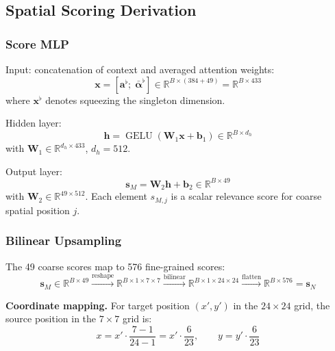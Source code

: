 \documentclass[11pt,a4paper]{article}
\DeclareMathOperator{\GELU}{GELU}
\newcommand{\R}{\mathbb{R}}
\newcommand{\vs}{\mathbf{s}}
\begin{document}
\subsection{Spatial Scoring Derivation}
\label{subsec:score_deriv}

\subsubsection{Score MLP}

Input: concatenation of context and averaged attention weights:
\begin{equation}
  \mathbf{x} = [\mathbf{a}^{\flat};\;
    \bar{\boldsymbol{\alpha}}^{\flat}]
    \in \R^{B \times (384 + 49)}
    = \R^{B \times 433}
\end{equation}
where $\mathbf{x}^{\flat}$ denotes squeezing the singleton dimension.

Hidden layer:
\begin{equation}
  \mathbf{h} = \GELU(\mathbf{W}_1 \mathbf{x} + \mathbf{b}_1)
    \in \R^{B \times d_h}
  \label{eq:score_hidden}
\end{equation}
with $\mathbf{W}_1 \in \R^{d_h \times 433}$, $d_h = 512$.

Output layer:
\begin{equation}
  \vs_M = \mathbf{W}_2 \mathbf{h} + \mathbf{b}_2
    \in \R^{B \times 49}
  \label{eq:score_output}
\end{equation}
with $\mathbf{W}_2 \in \R^{49 \times 512}$. Each element $s_{M,j}$ is a
scalar relevance score for coarse spatial position $j$.

\subsubsection{Bilinear Upsampling}

The 49 coarse scores map to 576 fine-grained scores:
\begin{equation}
  \vs_M \in \R^{B \times 49}
  \xrightarrow{\text{reshape}} \R^{B \times 1 \times 7 \times 7}
  \xrightarrow{\text{bilinear}} \R^{B \times 1 \times 24 \times 24}
  \xrightarrow{\text{flatten}} \R^{B \times 576}
  = \vs_N
  \label{eq:upsample}
\end{equation}

\textbf{Coordinate mapping.} For target position $(x', y')$ in the
$24 \times 24$ grid, the source position in the $7 \times 7$ grid is:
\begin{equation}
  x = x' \cdot \frac{7-1}{24-1} = x' \cdot \frac{6}{23},
  \qquad
  y = y' \cdot \frac{6}{23}
\end{equation}
\end{document}
